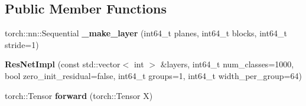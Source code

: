 \subsection*{Public Member Functions}
\begin{DoxyCompactItemize}
\item 
\mbox{\label{structvision_1_1models_1_1ResNetImpl_aa0cf3ab5d797e39520fe660430897cf7}} 
torch\+::nn\+::\+Sequential {\bfseries \+\_\+make\+\_\+layer} (int64\+\_\+t planes, int64\+\_\+t blocks, int64\+\_\+t stride=1)
\item 
\mbox{\label{structvision_1_1models_1_1ResNetImpl_a840a14a82e325fdb543ffca7eea9e28e}} 
{\bfseries Res\+Net\+Impl} (const std\+::vector$<$ int $>$ \&layers, int64\+\_\+t num\+\_\+classes=1000, bool zero\+\_\+init\+\_\+residual=false, int64\+\_\+t groups=1, int64\+\_\+t width\+\_\+per\+\_\+group=64)
\item 
\mbox{\label{structvision_1_1models_1_1ResNetImpl_ab43bc2f2883ff0b6593f11488d683ffa}} 
torch\+::\+Tensor {\bfseries forward} (torch\+::\+Tensor X)
\end{DoxyCompactItemize}

